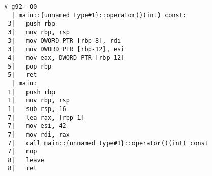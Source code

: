 \begin{lstlisting}[language={},numbers=none,title=\href{https://godbolt.org/z/xfcYM7}{\texttt{godbolt.org/z/xfcYM7}}]
# g92 -O0
  | main::{unnamed type#1}::operator()(int) const:
 3|   push rbp
 3|   mov rbp, rsp
 3|   mov QWORD PTR [rbp-8], rdi
 3|   mov DWORD PTR [rbp-12], esi
 4|   mov eax, DWORD PTR [rbp-12]
 5|   pop rbp
 5|   ret
  | main:
 1|   push rbp
 1|   mov rbp, rsp
 1|   sub rsp, 16
 7|   lea rax, [rbp-1]
 7|   mov esi, 42
 7|   mov rdi, rax
 7|   call main::{unnamed type#1}::operator()(int) const
 7|   nop
 8|   leave
 8|   ret
\end{lstlisting}
